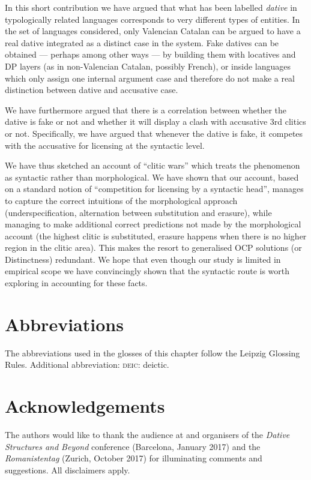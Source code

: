 \documentclass[output=paper,modfonts,nonflat,newtxmath,colorlinks,citecolor=brown]{langsci/langscibook}
\begin{document}
In this short contribution we have argued that what has been labelled \textit{dative} in typologically related languages corresponds to very different types of entities. In the set of languages considered, only Valencian Catalan can be argued to have a real dative integrated as a distinct case in the system. Fake datives can be obtained — perhaps among other ways — by building them with locatives and DP layers (as in non-Valencian Catalan, possibly French), or inside languages which only assign one internal argument case and therefore do not make a real distinction between dative and accusative case.

We have furthermore argued that there is a correlation between whether the dative is fake or not and whether it will display a clash with accusative 3rd clitics or not. Specifically, we have argued that whenever the dative is fake, it competes with the accusative for licensing at the syntactic level.

We have thus sketched an account of ``clitic wars'' which treats the phenomenon as syntactic rather than morphological. We have shown that our account, based on a standard notion of ``competition for licensing by a syntactic head'', manages to capture the correct intuitions of the morphological approach (underspecification, alternation between substitution and erasure), while managing to make additional correct predictions not made by the morphological account (the highest clitic is substituted, erasure happens when there is no higher region in the clitic area). This makes the resort to generalised OCP solutions (or  Distinctness) redundant. We hope that even though our study is limited in empirical scope we have convincingly shown that the syntactic route is worth exploring in accounting for these facts.


\section*{Abbreviations}
The abbreviations used in the glosses of this chapter follow the Leipzig Glossing Rules. Additional abbreviation: \textsc{deic}: deictic.

\section*{Acknowledgements}
The authors would like to thank the audience at and organisers of the \textit{Dative Structures and Beyond} conference (Barcelona, January 2017) and the \textit{Romanistentag} (Zurich, October 2017) for illuminating comments and suggestions. All disclaimers apply.

\sloppy
\printbibliography[heading=subbibliography,notkeyword=this]
\end{document}
